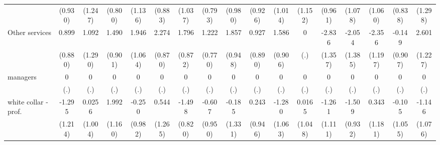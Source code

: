{\begin{tabular}{l*{16}{c}}
                    &     (0.930)         &     (1.247)         &     (0.800)         &     (1.136)         &     (0.883)         &     (1.037)         &     (0.793)         &     (0.980)         &     (0.926)         &     (1.014)         &     (1.152)         &     (0.961)         &     (1.078)         &     (1.060)         &     (0.838)         &     (1.298)         \\
[1em]
Other services      &       0.899         &       1.092         &       1.490         &       1.946         &       2.274\sym{**} &       1.796\sym{*}  &       1.222         &       1.857         &       0.927         &       1.586         &           0         &      -2.836\sym{*}  &      -2.054         &      -2.356\sym{*}  &      -0.149         &       2.601\sym{*}  \\
                    &     (0.880)         &     (1.290)         &     (0.901)         &     (1.064)         &     (0.870)         &     (0.872)         &     (0.770)         &     (0.948)         &     (0.890)         &     (0.906)         &         (.)         &     (1.357)         &     (1.385)         &     (1.197)         &     (0.907)         &     (1.227)         \\
[1em]
managers            &           0         &           0         &           0         &           0         &           0         &           0         &           0         &           0         &           0         &           0         &           0         &           0         &           0         &           0         &           0         &           0         \\
                    &         (.)         &         (.)         &         (.)         &         (.)         &         (.)         &         (.)         &         (.)         &         (.)         &         (.)         &         (.)         &         (.)         &         (.)         &         (.)         &         (.)         &         (.)         &         (.)         \\
[1em]
white collar - prof.&      -1.295         &      0.0256         &       1.992         &      -0.250         &       0.544         &      -1.498         &      -0.607         &      -0.185         &       0.243         &      -1.280         &      0.0165         &      -1.261         &      -1.509         &       0.343         &      -0.105         &      -1.146         \\
                    &     (1.214)         &     (1.004)         &     (1.160)         &     (0.982)         &     (1.265)         &     (0.820)         &     (0.950)         &     (1.331)         &     (0.946)         &     (1.063)         &     (1.048)         &     (1.111)         &     (0.932)         &     (1.181)         &     (1.055)         &     (1.076)         \\

\end{tabular}}
